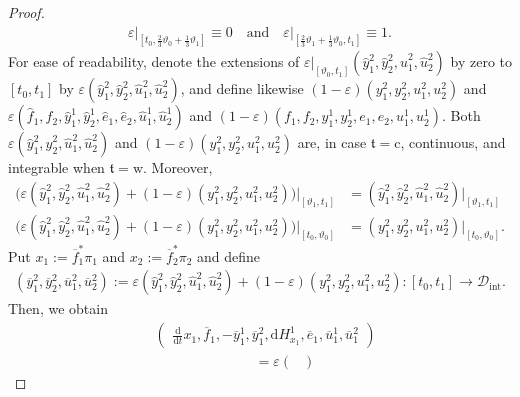 \documentclass[preprint,12pt]{elsarticle}
\theoremstyle{definition}
\begin{document}
\begin{proof}
\begin{align*}
\varepsilon\vert_{\left[t_0,\frac{2}{3}\vartheta_0+\frac{1}{3}\vartheta_1\right]}\equiv 0\quad\mathrm{and}\quad\varepsilon\vert_{\left[\frac{2}{3}\vartheta_1+\frac{1}{3}\vartheta_0,t_1\right]}\equiv 1.
\end{align*}
For ease of readability, denote the extensions of $\varepsilon\vert_{[\vartheta_0,t_1]}(\widehat{y}_1^2,\widehat{y}_2^2,\widehat{u}_1^2,\widehat{u}_2^2)$ by zero to $[t_0,t_1]$ by $\varepsilon(\widehat{y}_1^2,\widehat{y}_2^2,\widehat{u}_1^2,\widehat{u}_2^2)$, and define likewise $(1-\varepsilon)(y_1^2,y_2^2,u_1^2,u_2^2)$ and $\varepsilon(\widehat{f}_1,\widehat{f}_2,\widehat{y}_1^1,\widehat{y}_2^1,\widehat{e}_1,\widehat{e}_2,\widehat{u}_1^1,\widehat{u}_2^1)$ and $(1-\varepsilon)(f_1,f_2,y_1^1,y_2^1,e_1,e_2,u_1^1,u_2^1)$. Both $\varepsilon(\widehat{y}_1^2,\widehat{y}_2^2,\widehat{u}_1^2,\widehat{u}_2^2)$ and $(1-\varepsilon)(y_1^2,y_2^2,u_1^2,u_2^2)$ are, in case $\mathfrak{t} = \mathrm{c}$, continuous, and integrable when $\mathfrak{t} = \mathrm{w}$. Moreover,
\begin{align*}
\big(\varepsilon(\widehat{y}_1^2,\widehat{y}_2^2,\widehat{u}_1^2,\widehat{u}_2^2)+(1-\varepsilon)(y_1^2,y_2^2,u_1^2,u_2^2)\big)\vert_{[\vartheta_1,t_1]} & = (\widehat{y}_1^2,\widehat{y}_2^2,\widehat{u}_1^2,\widehat{u}_2^2)\vert_{[\vartheta_1,t_1]}\\
\big(\varepsilon(\widehat{y}_1^2,\widehat{y}_2^2,\widehat{u}_1^2,\widehat{u}_2^2)+(1-\varepsilon)(y_1^2,y_2^2,u_1^2,u_2^2)\big)\vert_{[t_0,\vartheta_0]} & = (y_1^2,y_2^2,u_1^2,u_2^2)\vert_{[t_0,\vartheta_0]}.
\end{align*}
Put $x_1:=\overline{f}_1^*\pi_1$ and $x_2:=\overline{f}_2^*\pi_2$ and define
\begin{align*}
(\overline{y}_1^2,\overline{y}_2^2,\overline{u}_1^2,\overline{u}_2^2) := \varepsilon(\widehat{y}_1^2,\widehat{y}_2^2,\widehat{u}_1^2,\widehat{u}_2^2)+(1-\varepsilon)(y_1^2,y_2^2,u_1^2,u_2^2): [t_0,t_1]\to\mathcal{D}_{\mathrm{int}}.
\end{align*}
Then, we obtain
\begin{align*}
& \begin{pmatrix}
\tfrac{\mathrm{d}}{\mathrm{d}t}x_1,\overline{f}_1,-\overline{y}_1^1,\overline{y}_1^2,\mathrm{d}H^1_{x_1},\overline{e}_1,\overline{u}_1^1,\overline{u}_1^2
\end{pmatrix}\\
& \hspace{3cm} = \varepsilon\begin{pmatrix}

\end{pmatrix}
\end{align*}
\end{proof}
\end{document}
